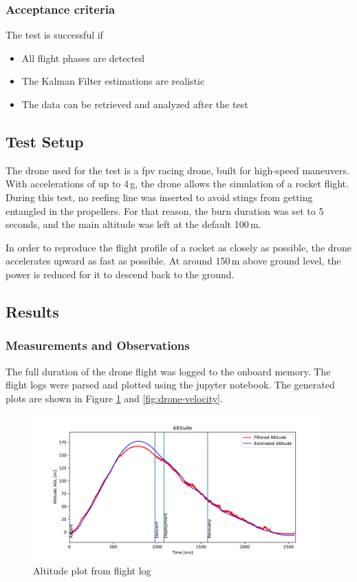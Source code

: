 \subsubsection{Acceptance criteria}
The test is successful if
\begin{itemize}
    \item All flight phases are detected
    \item The Kalman Filter estimations are realistic
    \item The data can be retrieved and analyzed after the test
\end{itemize}

\subsection{Test Setup}
The drone used for the test is a \acrshort{fpv} racing drone, built for high-speed maneuvers. With accelerations of up to 4\,g, the drone allows the simulation of a rocket flight. During this test, no reefing line was inserted to avoid stings from getting entangled in the propellers. For that reason, the burn duration was set to 5 seconds, and the main altitude was left at the default 100\,m.

In order to reproduce the flight profile of a rocket as closely as possible, the drone accelerates upward as fast as possible. At around 150\,m above ground level, the power is reduced for it to descend back to the ground.

\subsection{Results}
\subsubsection{Measurements and Observations}
The full duration of the drone flight was logged to the onboard memory. The flight logs were parsed and plotted using the jupyter notebook. The generated plots are shown in Figure \ref{fig:drone-altitude} and \ref{fig:drone-velocity}. 

\begin{figure}[h!]
	\centering
	\includegraphics[width=\textwidth]{plots/drone-altitude}
	\caption{Altitude plot from flight log}
	\label{fig:drone-altitude}
\end{figure}

